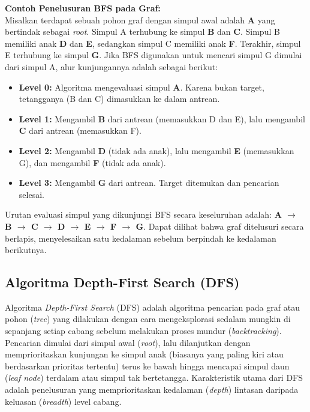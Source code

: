 \documentclass[12pt]{article}
\begin{document}
\vspace{0.3cm}
\noindent\textbf{Contoh Penelusuran BFS pada Graf:} \\
Misalkan terdapat sebuah pohon graf dengan simpul awal adalah \textbf{A} yang bertindak sebagai \textit{root}. Simpul A terhubung ke simpul \textbf{B} dan \textbf{C}. Simpul B memiliki anak \textbf{D} dan \textbf{E}, sedangkan simpul C memiliki anak \textbf{F}. Terakhir, simpul E terhubung ke simpul \textbf{G}. Jika BFS digunakan untuk mencari simpul G dimulai dari simpul A, alur kunjungannya adalah sebagai berikut:
\begin{itemize}
    \item \textbf{Level 0:} Algoritma mengevaluasi simpul \textbf{A}. Karena bukan target, tetangganya (B dan C) dimasukkan ke dalam antrean.
    \item \textbf{Level 1:} Mengambil \textbf{B} dari antrean (memasukkan D dan E), lalu mengambil \textbf{C} dari antrean (memasukkan F).
    \item \textbf{Level 2:} Mengambil \textbf{D} (tidak ada anak), lalu mengambil \textbf{E} (memasukkan G), dan mengambil \textbf{F} (tidak ada anak).
    \item \textbf{Level 3:} Mengambil \textbf{G} dari antrean. Target ditemukan dan pencarian selesai.
\end{itemize}
Urutan evaluasi simpul yang dikunjungi BFS secara keseluruhan adalah: \textbf{A $\rightarrow$ B $\rightarrow$ C $\rightarrow$ D $\rightarrow$ E $\rightarrow$ F $\rightarrow$ G}. Dapat dilihat bahwa graf ditelusuri secara berlapis, menyelesaikan satu kedalaman sebelum berpindah ke kedalaman berikutnya.

\subsection{Algoritma Depth-First Search (DFS)}

Algoritma \textit{Depth-First Search} (DFS) adalah algoritma pencarian pada graf atau pohon (\textit{tree}) yang dilakukan dengan cara mengeksplorasi sedalam mungkin di sepanjang setiap cabang sebelum melakukan proses mundur (\textit{backtracking}). Pencarian dimulai dari simpul awal (\textit{root}), lalu dilanjutkan dengan memprioritaskan kunjungan ke simpul anak (biasanya yang paling kiri atau berdasarkan prioritas tertentu) terus ke bawah hingga mencapai simpul daun (\textit{leaf node}) terdalam atau simpul tak bertetangga. Karakteristik utama dari DFS adalah penelusuran yang memprioritaskan kedalaman (\textit{depth}) lintasan daripada keluasan (\textit{breadth}) level cabang.
\end{document}
